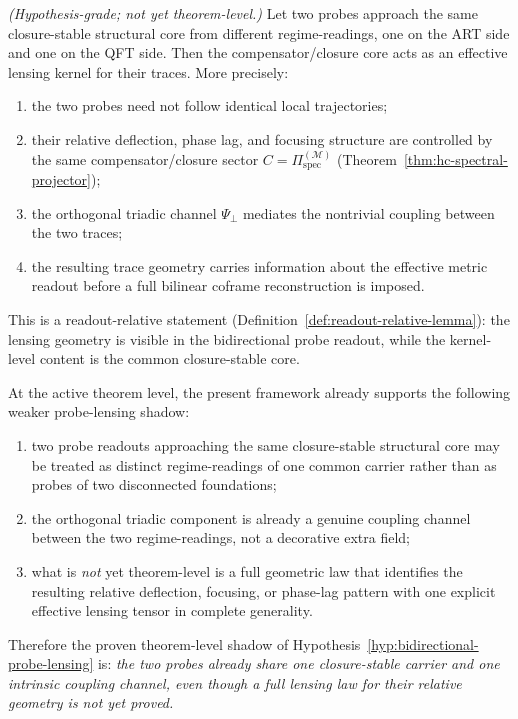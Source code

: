 \begin{proposition}
\label{hyp:bidirectional-probe-lensing}
\emph{(Hypothesis-grade; not yet theorem-level.)}
Let two probes approach the same closure-stable structural core from
different regime-readings, one on the ART side and one on the QFT side.
Then the compensator/closure core acts as an effective lensing kernel
for their traces. More precisely:
\begin{enumerate}[label=(\roman*)]
 \item the two probes need not follow identical local trajectories;
 \item their relative deflection, phase lag, and focusing structure are
 controlled by the same compensator/closure sector
 $C = \Pi^{(\mathcal{M})}_{\mathrm{spec}}$
 (Theorem~\ref{thm:hc-spectral-projector});
 \item the orthogonal triadic channel $\Psi_\perp$ mediates the
 nontrivial coupling between the two traces;
 \item the resulting trace geometry carries information about the
 effective metric readout before a full bilinear coframe
 reconstruction is imposed.
\end{enumerate}
This is a readout-relative statement
(Definition~\ref{def:readout-relative-lemma}): the lensing geometry is
visible in the bidirectional probe readout, while the kernel-level
content is the common closure-stable core.
\end{proposition}

\begin{theorem}
\label{thm:theorem-level-shadow-bidirectional-probe-lensing}
At the active theorem level, the present framework already supports the following weaker probe-lensing shadow:
\begin{enumerate}[leftmargin=2em,label=(\roman*)]
 \item two probe readouts approaching the same closure-stable structural core may be treated as distinct regime-readings of one common carrier rather than as probes of two disconnected foundations;
 \item the orthogonal triadic component is already a genuine coupling channel between the two regime-readings, not a decorative extra field;
 \item what is \emph{not} yet theorem-level is a full geometric law that identifies the resulting relative deflection, focusing, or phase-lag pattern with one explicit effective lensing tensor in complete generality.
\end{enumerate}
Therefore the proven theorem-level shadow of Hypothesis~\ref{hyp:bidirectional-probe-lensing} is:
\emph{the two probes already share one closure-stable carrier and one intrinsic coupling channel, even though a full lensing law for their relative geometry is not yet proved.}
\end{theorem}

